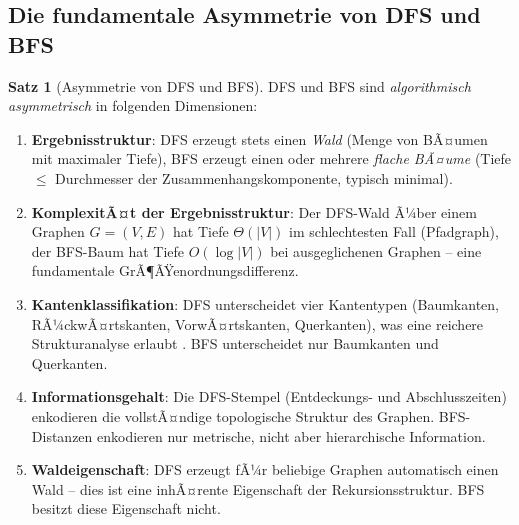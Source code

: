 ﻿\documentclass[12pt,a4paper]{article}
\theoremstyle{definition}
\newtheorem{theorem}{Satz}[section]
\theoremstyle{remark}
\begin{document}
\subsection{Die fundamentale Asymmetrie von DFS und BFS}

\begin{theorem}[Asymmetrie von DFS und BFS]
\label{thm:asymmetrie}
DFS und BFS sind \emph{algorithmisch asymmetrisch} in folgenden Dimensionen:
\begin{enumerate}[label=(\roman*)]
  \item \textbf{Ergebnisstruktur}: DFS erzeugt stets einen \emph{Wald}
        (Menge von BÃ¤umen mit maximaler Tiefe), BFS erzeugt einen oder
        mehrere \emph{flache BÃ¤ume} (Tiefe $\leq$ Durchmesser der
        Zusammenhangskomponente, typisch minimal).
  \item \textbf{KomplexitÃ¤t der Ergebnisstruktur}: Der DFS-Wald Ã¼ber
        einem Graphen $G = (V, E)$ hat Tiefe $\Theta(|V|)$ im
        schlechtesten Fall (Pfadgraph), der BFS-Baum hat Tiefe
        $O(\log |V|)$ bei ausgeglichenen Graphen -- eine fundamentale
        GrÃ¶ÃŸenordnungsdifferenz.
  \item \textbf{Kantenklassifikation}: DFS unterscheidet vier Kantentypen
        (Baumkanten, RÃ¼ckwÃ¤rtskanten, VorwÃ¤rtskanten, Querkanten), was eine
        reichere Strukturanalyse erlaubt \cite{Cormen2009}. BFS unterscheidet
        nur Baumkanten und Querkanten.
  \item \textbf{Informationsgehalt}: Die DFS-Stempel (Entdeckungs- und
        Abschlusszeiten) enkodieren die vollstÃ¤ndige topologische Struktur
        des Graphen. BFS-Distanzen enkodieren nur metrische, nicht aber
        hierarchische Information.
  \item \textbf{Waldeigenschaft}: DFS erzeugt fÃ¼r beliebige Graphen
        automatisch einen Wald -- dies ist eine inhÃ¤rente Eigenschaft der
        Rekursionsstruktur. BFS besitzt diese Eigenschaft nicht.
\end{enumerate}
\end{theorem}
\end{document}
